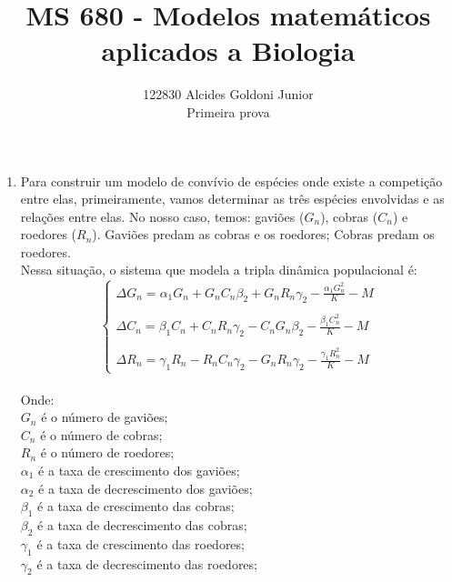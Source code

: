 \documentclass[a4paper]{article}
\title{MS 680 - Modelos matem\'{a}ticos aplicados a Biologia}
\author{122830 Alcides Goldoni Junior\\
  \small Primeira prova \\
}%
\begin{document}
\maketitle
\begin{enumerate}

\item
Para construir um modelo de conv\'ivio de esp\'ecies onde existe a competi\c{c}\~ao entre elas, primeiramente, vamos determinar as tr\^es esp\'ecies envolvidas e as rela\c{c}\~oes entre elas. No nosso caso, temos: gavi\~oes ($G_n$), cobras ($C_n$) e roedores ($R_n$). Gavi\~oes predam as cobras e os roedores; Cobras predam os roedores.\\
Nessa situa\c{c}\~ao, o sistema que modela a tripla din\^amica populacional \'e:
\begin{equation}
\left\{\begin{array}{l}
\Delta G_n = \alpha_1 G_n + G_n C_n\beta_2 + G_n R_n\gamma_2 - \frac{\alpha_1 G_n ^2}{K}  - M\\
\\
\Delta C_n = \beta_1 C_n + C_n R_n\gamma_2 - C_n G_n\beta_2 - \frac{\beta_1 C_n ^2}{K} - M \\
\\
\Delta R_n = \gamma_1 R_n - R_n C_n\gamma_2 - G_n R_n\gamma_2 - \frac{\gamma_1 R_n ^2}{K} -M 
\end{array}
\end{equation}
\\
Onde:\\
$G_n$ \'e o n\'umero de gavi\~oes;\\
$C_n$ \'e o n\'umero de cobras;\\
$R_n$ \'e o n\'umero de roedores;\\
$\alpha_1$ \'e a taxa de crescimento dos gavi\~oes;\\
$\alpha_2$ \'e a taxa de decrescimento dos gavi\~oes;\\
$\beta_1$ \'e a taxa de crescimento das cobras;\\
$\beta_2$ \'e a taxa de decrescimento das cobras;\\
$\gamma_1$ \'e a taxa de crescimento das roedores;\\
$\gamma_2$ \'e a taxa de decrescimento das roedores;\\

\end{enumerate}
\end{document}
